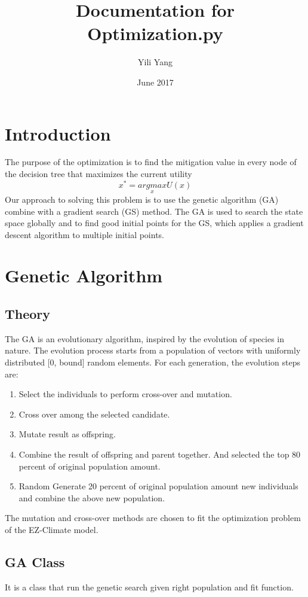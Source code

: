 \documentclass[12pt]{article}
\title{Documentation for Optimization.py}
\author{Yili Yang}
\date{June 2017}
\begin{document}
\maketitle

\section{Introduction}
The purpose of the optimization is to find the mitigation value in every node of the decision tree that maximizes the current utility
\begin{equation}\label{ObjectFunc}
  x^* = \underset{x}{argmax}U(x)
\end{equation}
Our approach to solving this problem is to use the genetic algorithm (GA) combine with a gradient search (GS) method. The GA is used to search the state space globally and to find good initial points for the GS, which applies a gradient descent algorithm to multiple initial points.
\section{Genetic Algorithm}
\subsection{Theory}
The GA is an evolutionary algorithm, inspired by the evolution of species in nature. The evolution process starts from a population of vectors with uniformly distributed [0, bound] random elements. For each generation, the evolution steps are:

\begin{enumerate}
  \item Select the individuals to perform cross-over and mutation.
  \item Cross over among the selected candidate.
  \item Mutate result as offspring.
  \item Combine the result of offspring and parent together. And selected the top 80 percent of original population amount.
  \item Random Generate 20 percent of original population amount new individuals and combine the above new population.
\end{enumerate}

The mutation and cross-over methods are chosen to fit the optimization problem of the EZ-Climate model.
\subsection{GA Class}
It is a class that run the genetic search given right population and fit function.
\end{document}
